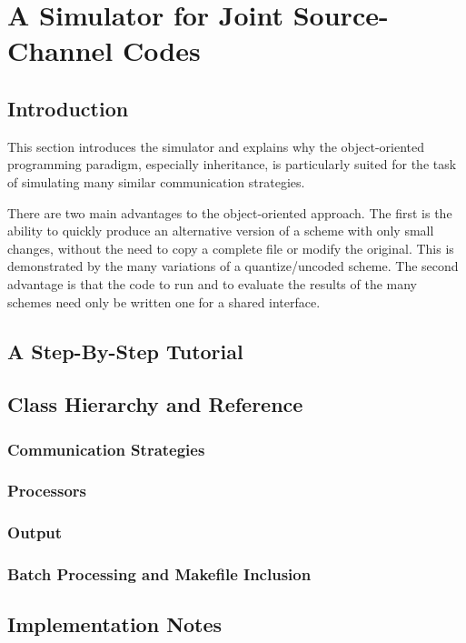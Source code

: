 \chapter{A Simulator for Joint Source-Channel Codes}%

\section{Introduction}

This section introduces the simulator and explains why the object-oriented
programming paradigm, especially inheritance, is particularly suited for the
task of simulating many similar communication strategies.

There are two main advantages to the object-oriented approach. The first is the
ability to quickly produce an alternative version of a scheme with only small
changes, without the need to copy a complete file or modify the original. This
is demonstrated by the many variations of a quantize/uncoded scheme. The second
advantage is that the code to run and to evaluate the results of the many
schemes need only be written one for a shared interface. 


\section{A Step-By-Step Tutorial}


\section{Class Hierarchy and Reference}

\subsection{Communication Strategies}

\subsection{Processors}

\subsection{Output}

\subsection{Batch Processing and Makefile Inclusion}


\section{Implementation Notes}
